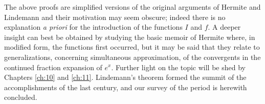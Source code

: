The above proofs are simplified versions of the original arguments of Hermite and Lindemann and their motivation may seem obscure; indeed there is no explanation \textit{a priori} for the introduction of the functions $I$ and $f$. A deeper insight can best be obtained by studying the basic memoir of Hermite where, in modified form, the functions first occurred, but it may be said that they relate to generalizations, concerning simultaneous approximation, of the convergents in the continued fraction expansion of $e^x$. Further light on the topic will be shed by Chapters \ref{ch:10} and \ref{ch:11}. Lindemann's theorem formed the summit of the accomplishments of the last century, and our survey of the period is herewith concluded.
